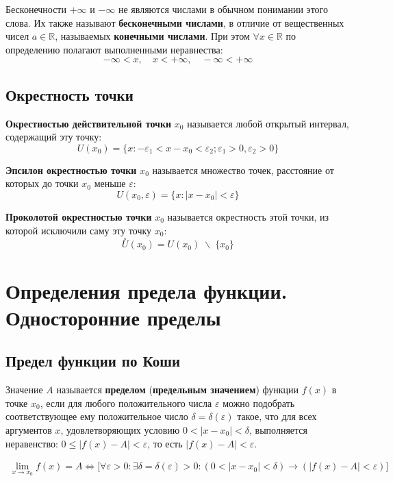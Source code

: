 \documentclass[a4paper,12pt,oneside]{extbook}
\theoremstyle{numbered}
\theoremstyle{unnumbered}
\theoremstyle{named}
\theoremstyle{unnumbered}
\theoremstyle{named}
\theoremstyle{named}
\theoremstyle{named}
\begin{document}
Бесконечности \(+\infty\) и \(-\infty\) не являются числами в обычном понимании этого слова. Их также называют \textbf{бесконечными числами}, в отличие от вещественных чисел \(a \in \mathbb{R}\), называемых \textbf{конечными числами}. При этом \(\forall x \in \mathbb{R}\) по определению полагают выполненными неравнества:
\[
    -\infty < x, \quad x < +\infty, \quad -\infty < +\infty
\]

\subsection{Окрестность точки}%
\label{sub:Окрестность точки}

\textbf{Окрестностью действительной точки} \(x_0\) называется любой открытый интервал, содержащий эту точку:
\[
    U(x_0) = \{x: -\varepsilon_1 < x - x_0 < \varepsilon_2; \varepsilon_1 > 0, \varepsilon_2 > 0\}
\]

\textbf{Эпсилон окрестностью точки} \(x_0\) называется множество точек, расстояние от которых до точки \(x_0\) меньше \(\varepsilon\):
\[
    U(x_0, \varepsilon) = \{x: |x - x_0| < \varepsilon\}
\]

\textbf{Проколотой окрестностью точки} \(x_0\) называется окрестность этой точки, из которой исключили саму эту точку \(x_0\):
\[
    \overset{\circ}{U}(x_0) = U(x_0) \; \backslash \; \{x_0\}
\]


\section{Определения предела функции. Односторонние пределы}%
\label{sec:Определения предела функции. Односторонние пределы}

\subsection{Предел функции по Коши}%
\label{sub:Предел функции по Коши}

Значение \(A\) называется \textbf{пределом} (\textbf{предельным значением}) функции \(f(x)\) в точке \(x_0\), если для любого положительного числа \(\varepsilon\) можно подобрать соответствующее ему положительное число \(\delta = \delta (\varepsilon)\) такое, что для всех аргументов \(x\), удовлетворяющих условию \(0 < |x - x_0| < \delta\), выполняется неравенство: \(0 \leq |f(x) - A| < \varepsilon\), то есть \(|f(x) -A| < \varepsilon\).

\begin{gather*}
    \lim_{x \to x_0}{f(x)} = A \iff \Big[ \forall \varepsilon > 0: \exists \delta = \delta (\varepsilon) > 0: (0 < |x - x_0| < \delta) \to (|f(x) - A| < \varepsilon) \Big]
\end{gather*}
\end{document}
